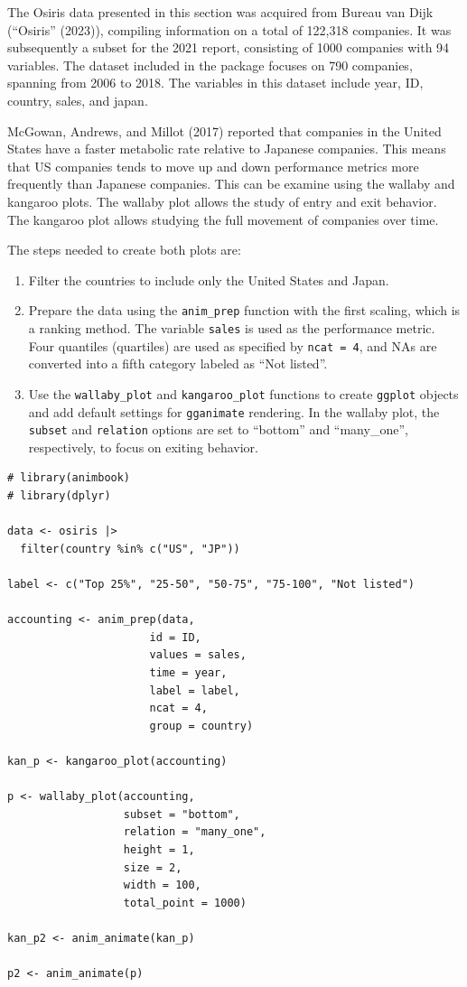 The Osiris data presented in this section was acquired from Bureau van Dijk ({``Osiris''} (2023)), compiling information on a total of 122,318 companies. It was subsequently a subset for the 2021 report, consisting of 1000 companies with 94 variables. The dataset included in the package focuses on 790 companies, spanning from 2006 to 2018. The variables in this dataset include year, ID, country, sales, and japan.

McGowan, Andrews, and Millot (2017) reported that companies in the United States have a faster metabolic rate relative to Japanese companies. This means that US companies tends to move up and down performance metrics more frequently than Japanese companies. This can be examine using the wallaby and kangaroo plots. The wallaby plot allows the study of entry and exit behavior. The kangaroo plot allows studying the full movement of companies over time.

The steps needed to create both plots are:

\begin{enumerate}
\def\labelenumi{\arabic{enumi}.}
\tightlist
\item
  Filter the countries to include only the United States and Japan.
\item
  Prepare the data using the \texttt{anim\_prep} function with the first scaling, which is a ranking method. The variable \texttt{sales} is used as the performance metric. Four quantiles (quartiles) are used as specified by \texttt{ncat\ =\ 4}, and NAs are converted into a fifth category labeled as ``Not listed''.
\item
  Use the \texttt{wallaby\_plot} and \texttt{kangaroo\_plot} functions to create \texttt{ggplot} objects and add default settings for \texttt{gganimate} rendering. In the wallaby plot, the \texttt{subset} and \texttt{relation} options are set to ``bottom'' and ``many\_one'', respectively, to focus on exiting behavior.
\end{enumerate}

\begin{verbatim}
# library(animbook)
# library(dplyr)

data <- osiris |> 
  filter(country %in% c("US", "JP"))

label <- c("Top 25%", "25-50", "50-75", "75-100", "Not listed")

accounting <- anim_prep(data, 
                      id = ID, 
                      values = sales, 
                      time = year, 
                      label = label, 
                      ncat = 4, 
                      group = country)

kan_p <- kangaroo_plot(accounting)

p <- wallaby_plot(accounting,
                  subset = "bottom",
                  relation = "many_one",
                  height = 1,
                  size = 2,
                  width = 100,
                  total_point = 1000)

kan_p2 <- anim_animate(kan_p)

p2 <- anim_animate(p)
\end{verbatim}

